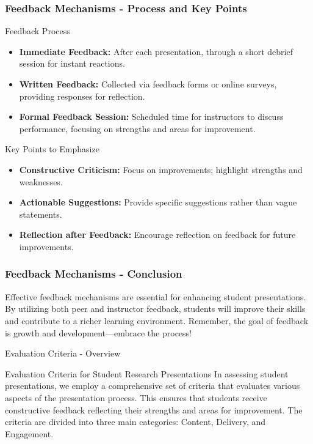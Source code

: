 \documentclass[aspectratio=169]{beamer}
\begin{document}
\begin{frame}[fragile]
    \frametitle{Feedback Mechanisms - Process and Key Points}
    \begin{block}{Feedback Process}
        \begin{itemize}
            \item \textbf{Immediate Feedback:} After each presentation, through a short debrief session for instant reactions.
            \item \textbf{Written Feedback:} Collected via feedback forms or online surveys, providing responses for reflection.
            \item \textbf{Formal Feedback Session:} Scheduled time for instructors to discuss performance, focusing on strengths and areas for improvement.
        \end{itemize}
    \end{block}
    
    \begin{block}{Key Points to Emphasize}
        \begin{itemize}
            \item \textbf{Constructive Criticism:} Focus on improvements; highlight strengths and weaknesses.
            \item \textbf{Actionable Suggestions:} Provide specific suggestions rather than vague statements.
            \item \textbf{Reflection after Feedback:} Encourage reflection on feedback for future improvements.
        \end{itemize}
    \end{block}
\end{frame}

\begin{frame}[fragile]
    \frametitle{Feedback Mechanisms - Conclusion}
    Effective feedback mechanisms are essential for enhancing student presentations. By utilizing both peer and instructor feedback, students will improve their skills and contribute to a richer learning environment. Remember, the goal of feedback is growth and development—embrace the process!
\end{frame}

\begin{frame}[fragile]{Evaluation Criteria - Overview}
    \begin{block}{Evaluation Criteria for Student Research Presentations}
        In assessing student presentations, we employ a comprehensive set of criteria that evaluates various aspects of the presentation process. This ensures that students receive constructive feedback reflecting their strengths and areas for improvement. The criteria are divided into three main categories: Content, Delivery, and Engagement.
    \end{block}
\end{frame}
\end{document}
